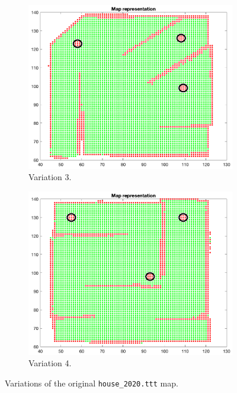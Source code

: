 \documentclass[a4paper, 10pt, conference]{ieeeconf}
\begin{document}
\begin{figure}[!h]
        \begin{subfigure}[b]{0.23\textwidth}
            \centering
            \includegraphics[width=\textwidth]{resources/png/house-var-3.png}
            \caption{Variation 3.}
        \end{subfigure}
        \hfill
        \begin{subfigure}[b]{0.23\textwidth}
            \centering
            \includegraphics[width=\textwidth]{resources/png/house-var-4.png}
            \caption{Variation 4.}
        \end{subfigure}
        \caption{Variations of the original \texttt{house\_2020.ttt} map.}
        \label{fig:additional.tests.variations}
    \end{figure}
    
\end{document}
